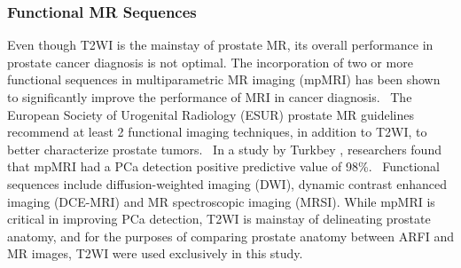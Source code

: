 \subsubsection{Functional MR Sequences}
Even though T2WI is the mainstay of prostate MR, its overall performance in
prostate cancer diagnosis is not optimal. The incorporation of two or more
functional sequences in multiparametric MR imaging (mpMRI) has been shown to
significantly improve the performance of MRI in cancer
diagnosis.~\cite{Turkbey2012}  The European Society of Urogenital Radiology
(ESUR) prostate MR guidelines recommend at least 2 functional imaging
techniques, in addition to T2WI, to better characterize prostate
tumors.~\cite{Barentsz2012} In a study by Turkbey \etal, researchers found that
mpMRI had a PCa detection positive predictive value of 98\%.~\cite{Turkbey2012}
Functional sequences include diffusion-weighted imaging (DWI), dynamic contrast
enhanced imaging (DCE-MRI) and MR spectroscopic imaging (MRSI).  While mpMRI is
critical in improving PCa detection, T2WI is mainstay of delineating prostate
anatomy, and for the purposes of comparing prostate anatomy between ARFI and MR
images, T2WI were used exclusively in this study.

